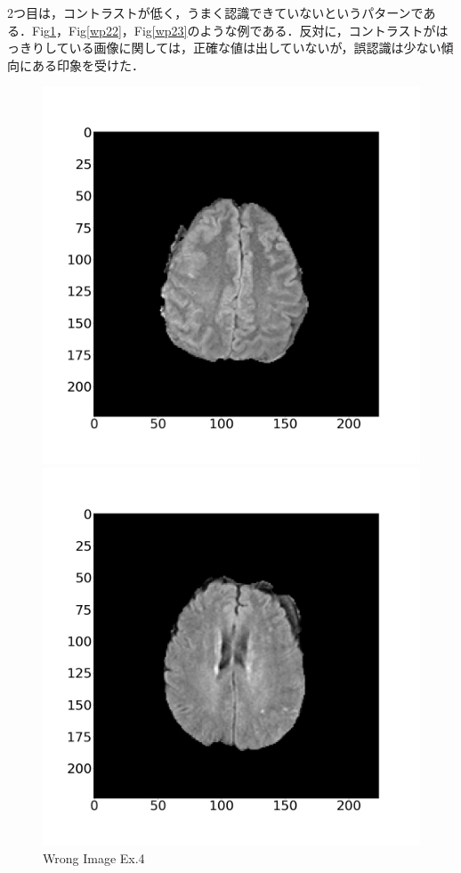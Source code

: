 \documentclass[11pt,a4j]{jarticle}
\begin{document}
2つ目は，コントラストが低く，うまく認識できていないというパターンである．Fig\ref{wp21}，Fig\ref{wp22}，Fig\ref{wp23}のような例である．反対に，コントラストがはっきりしている画像に関しては，正確な値は出していないが，誤認識は少ない傾向にある印象を受けた．

\begin{figure}[ht]
	\begin{minipage}{0.32\hsize}
		\centering
		\includegraphics[width=\linewidth]{../2_MedicalImageClassification/Dataset/1319.jpg}
		\vspace{-1cm}
		\renewcommand{\figurename}{Fig}
		\caption{Wrong Image Ex.4}
		\label{wp21}
	\end{minipage}
	\begin{minipage}{0.32\hsize}
		\centering
		\includegraphics[width=\linewidth]{../2_MedicalImageClassification/Dataset/1563.jpg}

\end{minipage}
\end{figure}
\end{document}
